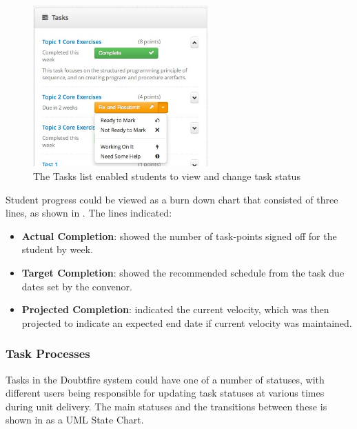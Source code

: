 \begin{figure}[thbp]
  \centering
  \includegraphics[width=0.6\textwidth]{StudentTasks}
  \caption{The Tasks list enabled students to view and change task status}
  \label{fig:task_list}
\end{figure}

Student progress could be viewed as a burn down chart that consisted of three lines, as shown in . The lines indicated:
\begin{itemize}[noitemsep,nolistsep]
  \item \textbf{Actual Completion}: showed the number of task-points signed off for the student by week.
  \item \textbf{Target Completion}: showed the recommended schedule from the task due dates set by the convenor.
  \item \textbf{Projected Completion}: indicated the current velocity, which was then projected to indicate an expected end date if current velocity was maintained.
\end{itemize}


\subsubsection{Task Processes} %
\label{sub:task_processes}

Tasks in the Doubtfire system could have one of a number of statuses, with different users being responsible for updating task statuses at various times during unit delivery. The main statuses and the transitions between these is shown in  as a UML State Chart. 

